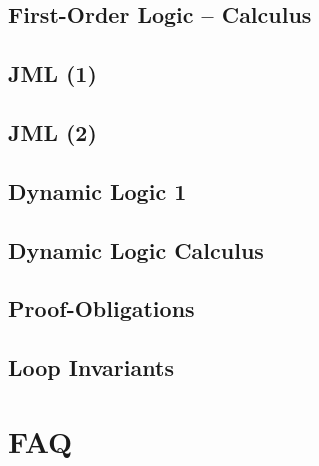 \documentclass[12pt,accentcolor=tud1b,bibtotoc,colorback,linedtoc,liststotoc,bigchapter,noresetcounter]{tudreport}
\begin{document}
\newpage

\section{First-Order Logic -- Calculus}

\newpage

\section{JML (1)}

\newpage

\section{JML (2)}

\newpage

\section{Dynamic Logic 1}

\newpage

\section{Dynamic Logic Calculus}

\newpage

\section{Proof-Obligations}

\newpage

\section{Loop Invariants}

\newpage



\chapter{FAQ}


 
\end{document}
